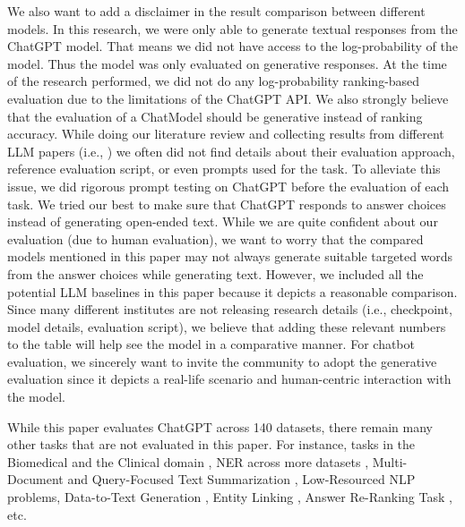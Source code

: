\documentclass[11pt]{article}
\begin{document}
We also want to add a disclaimer in the result comparison between different models. In this research, we were only able to generate textual  responses from the ChatGPT model. That means we did not have access to the log-probability of the model. Thus the model was only evaluated on generative responses. At the time of the research performed, we did not do any log-probability ranking-based evaluation due to the limitations of the ChatGPT API. We also strongly believe that the evaluation of a ChatModel should be generative instead of ranking accuracy. While doing our literature review and collecting results from different LLM papers (i.e., \citet{palm2,touvron2023llama,openai2023gpt4}) we often did not find details about their evaluation approach,  reference evaluation script, or even  prompts used for the task. To alleviate this issue, we did rigorous prompt testing on ChatGPT before the evaluation of each task. We tried our best to make sure that ChatGPT responds to answer choices instead of generating open-ended text. While we are quite confident about our evaluation (due to human evaluation), we want to worry that the compared models mentioned in this paper may not always generate suitable targeted words from the answer choices while generating text. However, we included all the potential LLM baselines in this paper because it depicts a reasonable comparison. Since many different institutes are not releasing research details (i.e., checkpoint, model details, evaluation script), we believe that adding these relevant numbers to the table will help see the model in a comparative manner. For chatbot evaluation, we sincerely want to invite the community to adopt the generative evaluation since it depicts a real-life scenario and human-centric interaction with the model.


While this paper evaluates ChatGPT across 140 datasets, there remain many other tasks that are not evaluated in this paper. For instance, tasks in the Biomedical and the Clinical domain \cite{luo2022biogpt,lee2020biobert,clinicalbert,beltagy2019scibert,blurb,blue}, NER across more datasets \cite{tjong2003introductionner,multiconer-report-ner,fu2022effective,laskar2022improving}, Multi-Document and Query-Focused Text Summarization \cite{laskar2020wslds,zhong-etal-2021-qmsum,su-etal-2022-tacl,laskar-etal-2022-domain}, Low-Resourced \cite{hedderich2021surveylowresource} NLP problems, Data-to-Text Generation \cite{kantharaj2022chart,rahman2023chartsumm}, Entity Linking \cite{wu2020scalableblink,ayoola2022refined,laskar2022auto,laskar-etal-2022-blink}, Answer Re-Ranking Task \cite{garg2020tanda,laskar2020contextualized}, etc.
\end{document}
